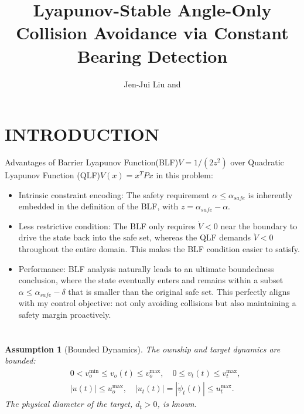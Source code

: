 \documentclass[10pt]{article}
\title{\LARGE \bf
Lyapunov-Stable Angle-Only Collision Avoidance via Constant Bearing Detection
}
\author{Jen-Jui Liu and %
}
\newtheorem{assumption}{Assumption}
\begin{document}
\maketitle
\thispagestyle{empty}
\pagestyle{empty}


\begin{abstract}



\end{abstract}
\cite{9482820}

\section{INTRODUCTION}

Advantages of Barrier Lyapunov Function(BLF)$V = 1/(2z^2)$ over Quadratic Lyapunov Function (QLF)$V(x) = x^T P x$ in this problem:
\begin{itemize}
    \item Intrinsic constraint encoding: The safety requirement $\alpha \leq \alpha_{safe}$ is inherently embedded in the definition of the BLF, with $z = \alpha_{safe} - \alpha$.

    \item Less restrictive condition: The BLF only requires $\dot{V} < 0$ near the boundary to drive the state back into the safe set, whereas the QLF demands $\dot{V} < 0$ throughout the entire domain. This makes the BLF condition easier to satisfy.

    \item Performance: BLF analysis naturally leads to an ultimate boundedness conclusion, where the state eventually enters and remains within a subset $\alpha \leq \alpha_{safe}-\delta$ that is smaller than the original safe set. This perfectly aligns with my control objective: not only avoiding collisions but also maintaining a safety margin proactively.
\end{itemize}
\section{}

\begin{assumption}[Bounded Dynamics]\label{assump:bounds}
    The ownship and target dynamics are bounded:
    \begin{align*}
        &0 < v_o^{\min} \leq v_o(t) \leq v_o^{\max}, \quad
        0 \leq v_t(t) \leq v_t^{\max}, \\
        &|u(t)| \leq u_o^{\max}, \quad
        |u_t(t)| = |\dot{\psi}_t(t)| \leq u_t^{\max}.
    \end{align*}
    The physical diameter of the target, $d_t > 0$, is known.
\end{assumption}
\end{document}
